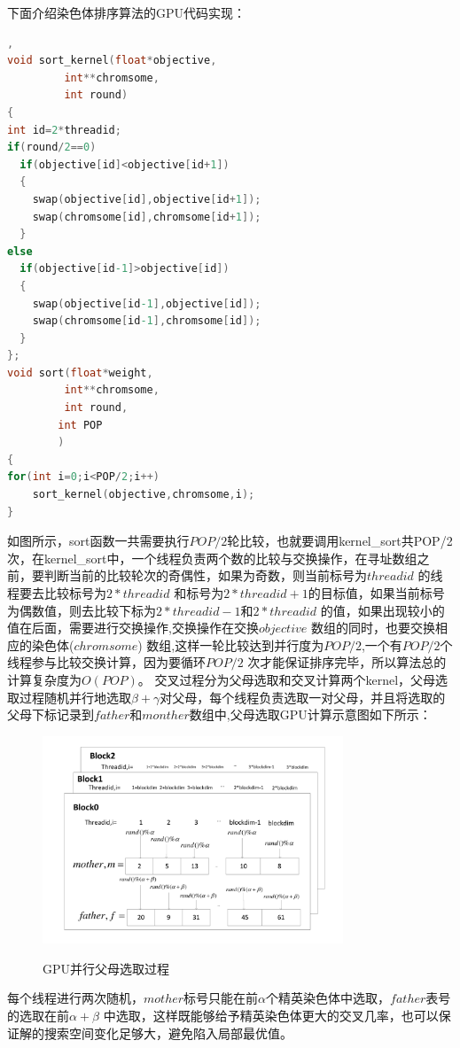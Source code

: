 下面介绍染色体排序算法的GPU代码实现：
\begin{lstlisting}[language=C],
void sort_kernel(float*objective,
	     int**chromsome,
	     int round)
{
int id=2*threadid;
if(round/2==0)
  if(objective[id]<objective[id+1])
  {
	swap(objective[id],objective[id+1]);
	swap(chromsome[id],chromsome[id+1]);
  }
else
  if(objective[id-1]>objective[id])
  {
	swap(objective[id-1],objective[id]);
	swap(chromsome[id-1],chromsome[id]);
  }
};
void sort(float*weight,
	     int**chromsome,
	     int round,
		int POP
		)
{
for(int i=0;i<POP/2;i++)
    sort_kernel(objective,chromsome,i);
}
\end{lstlisting}
  如图所示，sort函数一共需要执行$POP/2$轮比较，也就要调用kernel\_sort共POP/2次，在kernel\_sort中，一个线程负责两个数的比较与交换操作，在寻址数组之前，要判断当前的比较轮次的奇偶性，如果为奇数，则当前标号为$threadid$ 的线程要去比较标号为$2*threadid$ 和标号为$2*threadid+1$的目标值，如果当前标号为偶数值，则去比较下标为$2*threadid-1$和$2*threadid$ 的值，如果出现较小的值在后面，需要进行交换操作,交换操作在交换$objective$ 数组的同时，也要交换相应的染色体($chromsome$) 数组,这样一轮比较达到并行度为$POP/2$,一个有$POP/2$个线程参与比较交换计算，因为要循环$POP/2$ 次才能保证排序完毕，所以算法总的计算复杂度为$O(POP)$。
  交叉过程分为父母选取和交叉计算两个kernel，父母选取过程随机并行地选取$\beta+\gamma$对父母，每个线程负责选取一对父母，并且将选取的父母下标记录到$father$和$monther$数组中,父母选取GPU计算示意图如下所示：
\begin{figure}
  \begin{center}
    {\includegraphics[width=0.8\textwidth]{figures/choose.pdf}}
    \end{center}
  \caption{{\footnotesize{GPU并行父母选取过程}}}
  \label{IterNum}
\end{figure}
  每个线程进行两次随机，$mother$标号只能在前$\alpha$个精英染色体中选取，$father$表号的选取在前$\alpha+\beta$ 中选取，这样既能够给予精英染色体更大的交叉几率，也可以保证解的搜索空间变化足够大，避免陷入局部最优值。
